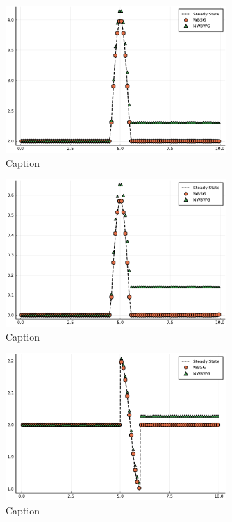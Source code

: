 \documentclass[12pt]{article}
\begin{document}
\begin{figure}[!htb]
    \centering
    \includegraphics[width=0.75\textwidth]{Figures/mean_sgwb}
    \caption{Caption}
    \label{fig:b1-mean}
\end{figure}
\begin{figure}[!htb]
    \centering
    \includegraphics[width=0.75\textwidth]{Figures/sd_sgwb}
    \caption{Caption}
    \label{fig:b1-sd}
\end{figure}
\begin{figure}[!htb]
    \centering
    \includegraphics[width=0.75\textwidth]{Figures/mean_dc_sgwb}
    \caption{Caption}
    \label{fig:b2-mean}
\end{figure}
\end{document}
